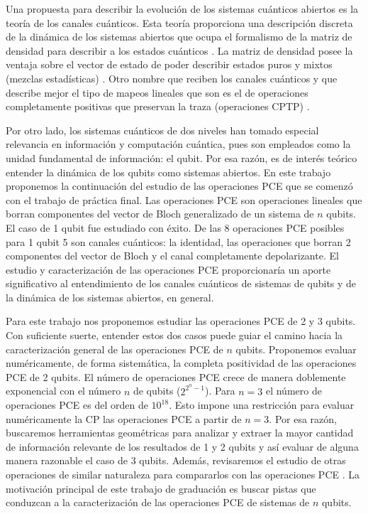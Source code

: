 Una propuesta para describir la evolución de los sistemas cuánticos abiertos
es la teoría de los canales cuánticos. Esta teoría proporciona una descripción
discreta de la dinámica de los sistemas abiertos que ocupa el formalismo
de la matriz de densidad para describir a los estados cuánticos
\cite{nielsen_chuang_2011}. La matriz
de densidad posee la ventaja sobre el vector de estado de poder describir
estados puros y mixtos (mezclas estadísticas) \cite{sakurai_napolitano_2017}. 
Otro nombre que reciben 
los canales cuánticos y que describe mejor el tipo de mapeos lineales 
que son es el de operaciones completamente positivas que preservan la traza 
(operaciones CPTP) \cite{bengtsson_zyczkowski_2017}.

Por otro lado, los sistemas cuánticos de dos niveles han tomado especial
relevancia en información y computación cuántica, pues son empleados 
como la unidad fundamental de información: el qubit. Por esa razón, es
de interés teórico entender la dinámica de los qubits como sistemas 
abiertos. En este trabajo proponemos la continuación del estudio de 
las operaciones PCE que se comenzó con el trabajo de práctica final.
Las operaciones PCE son operaciones lineales que borran componentes
del vector de Bloch generalizado de un sistema de $n$ qubits. El caso 
de 1 qubit fue estudiado con éxito. De las 8 operaciones PCE posibles para
1 qubit 5 son canales cuánticos: la identidad, las operaciones que borran 2 
componentes del vector de Bloch y el canal completamente depolarizante.
El estudio y caracterización de las operaciones PCE proporcionaría 
un aporte significativo al entendimiento de los canales cuánticos de
sistemas de qubits y de la dinámica de los sistemas abiertos, en general.

Para este trabajo nos proponemos estudiar las operaciones PCE de 
2 y 3 qubits. Con suficiente suerte, entender estos dos casos
puede guiar el camino hacia la caracterización general de las operaciones
PCE de $n$ qubits. Proponemos evaluar numéricamente, de forma sistemática, 
la completa positividad de las operaciones PCE de 2 qubits. El número de
operaciones PCE crece de manera doblemente exponencial con el número $n$ de
qubits ($2^{2^n-1}$). Para $n=3$ el número de 
operaciones PCE es del orden de $10^{18}$. Esto impone una restricción  
para evaluar numéricamente la CP las operaciones PCE a partir de $n=3$.
Por esa razón, buscaremos herramientas geométricas para analizar 
y extraer la mayor cantidad de información relevante de los 
resultados de 1 y 2 qubits y así evaluar de alguna manera razonable
el caso de 3 qubits. Además, revisaremos el 
estudio de otras operaciones de similar naturaleza para compararlos
con las operaciones PCE \cite{nathanson2007pauli}. 
La motivación principal de este trabajo de graduación 
es buscar pistas que conduzcan a la caracterización de las 
operaciones PCE de sistemas de $n$ qubits.


